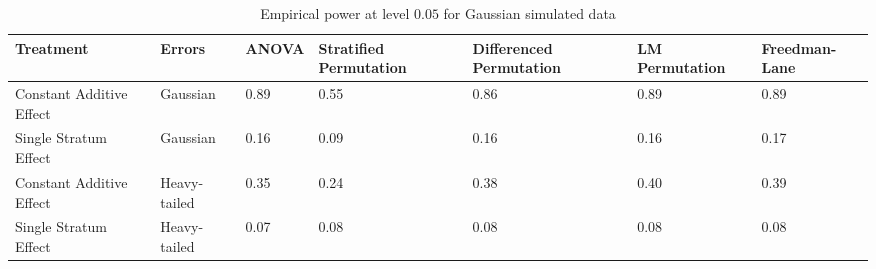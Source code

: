 \begin{table}[ht]
\centering
\begin{tabular}{p{1.15in}|p{0.7in}|p{0.6in}p{0.8in}p{0.8in}p{0.8in}p{0.75in}}
  \hline
Treatment & Errors & ANOVA & Stratified Permutation & Differenced Permutation & LM Permutation & Freedman-Lane \\ 
  \hline
Constant Additive Effect & Gaussian & 0.89 & 0.55 & 0.86 & 0.89 & 0.89 \\ 
  Single Stratum Effect & Gaussian & 0.16 & 0.09 & 0.16 & 0.16 & 0.17 \\ 
  Constant Additive Effect & Heavy-tailed & 0.35 & 0.24 & 0.38 & 0.40 & 0.39 \\ 
  Single Stratum Effect & Heavy-tailed & 0.07 & 0.08 & 0.08 & 0.08 & 0.08 \\ 
   \hline
\end{tabular}
\caption{Empirical power at level $0.05$ for Gaussian simulated data} 
\label{tab:normal_power}
\end{table}
